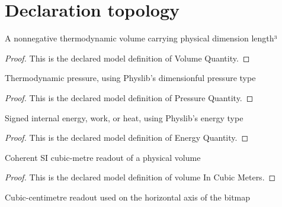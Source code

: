 \section{Declaration topology}
\begin{definition}
  \label{def:physics:phyx-mini-0409:phyxminiproblems-problemphyxmini0409-volumequantity}
  A nonnegative thermodynamic volume carrying physical dimension length³
\end{definition}
\begin{proof}
  This is the declared model definition of Volume Quantity.
\end{proof}
\begin{definition}
  \label{def:physics:phyx-mini-0409:phyxminiproblems-problemphyxmini0409-pressurequantity}
  Thermodynamic pressure, using Physlib's dimensionful pressure type
\end{definition}
\begin{proof}
  This is the declared model definition of Pressure Quantity.
\end{proof}
\begin{definition}
  \label{def:physics:phyx-mini-0409:phyxminiproblems-problemphyxmini0409-energyquantity}
  Signed internal energy, work, or heat, using Physlib's energy type
\end{definition}
\begin{proof}
  This is the declared model definition of Energy Quantity.
\end{proof}
\begin{definition}
  \label{def:physics:phyx-mini-0409:phyxminiproblems-problemphyxmini0409-volumeincubicmeters}
  Coherent SI cubic-metre readout of a physical volume
\end{definition}
\begin{proof}
  This is the declared model definition of volume In Cubic Meters.
\end{proof}
\begin{definition}
  \label{def:physics:phyx-mini-0409:phyxminiproblems-problemphyxmini0409-volumeincubiccentimeters}
  Cubic-centimetre readout used on the horizontal axis of the bitmap
\end{definition}
